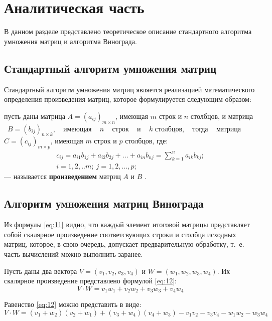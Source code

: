 \chapter{Аналитическая часть}

В данном разделе представлено теоретическое описание стандартного алгоритма
умножения матриц и алгоритма Винограда.

\section{Стандартный алгоритм умножения матриц}

Стандартный алгоритм умножения матриц является реализацией математического
определения произведения матриц, которое формулируется следующим образом:

    пусть даны матрица $A = (a_{ij})_{m \times n}$, имеющая $m$ строк и $n$
столбцов, и матрица ~$B = (b_{ij})_{n \times k}$, ~ имеющая ~ $n$ ~ строк ~ и ~
$k$ столбцов, ~ тогда ~ матрица\\ ${C=(c_{ij})_{m \times p}}$, имеющая $m$
строк и $p$ столбцов, где:
\begin{equation}\label{eq:11}
    \begin{gathered}
        c_{ij}=a_{i1}b_{1j}+a_{i2}b_{2j} +...+a_{in}b_{nj}=\sum\limits_{k=1}^n
        a_{ik}b_{kj};\\
        i = 1,2,..m;~j = 1,2,...,p;
    \end{gathered}
\end{equation}
--- называется \textbf{произведением} матриц $A$ и $B$ \cite{math}.

\section{Алгоритм умножения матриц Винограда}

Из формулы \ref{eq:11} видно, что каждый элемент итоговой матрицы представляет
собой скалярное произведение соответсвующих строки и столбца исходных матриц,
которое, в свою очередь, допускает предварительную обработку, т.~е. часть
вычислений можно выполнить заранее.

Пусть даны два вектора $V=(v_1, v_2, v_3, v_4)$ и
$W=(w_1,w_2,w_3,w_4)$. Их скалярное произведение
представлено формулой \ref{eq:12}:
\begin{equation}\label{eq:12}
    V \cdot W = v_1w_1+v_2w_2+v_3w_3+v_4w_4
\end{equation}

Равенство \ref{eq:12} можно представить в виде:
\begin{equation}\label{eq:13}
    V \cdot W = (v_1+w_2)(v_2+w_1)+(v_3+w_4)(v_4+w_3)-v_1v_2-v_3v_4-w_1w_2-w_3w_4
\end{equation}

